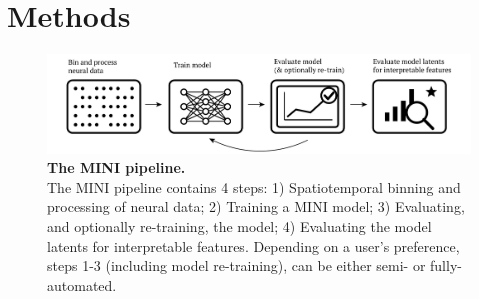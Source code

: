 \section{Methods}

\begin{figure}[h]
    \centering
    \includegraphics[width=\linewidth]{figures/mini_pipeline.pdf}
    \caption{
        \textbf{The MINI pipeline.} \\
        \small The MINI pipeline contains 4 steps: 1) Spatiotemporal binning and processing of neural data; 2) Training a MINI model; 3) Evaluating, and optionally re-training, the model; 4) Evaluating the model latents for interpretable features. Depending on a user's preference, steps 1-3 (including model re-training), can be either semi- or fully-automated.
    }
    \label{fig:mini_pipeline}
\end{figure}




